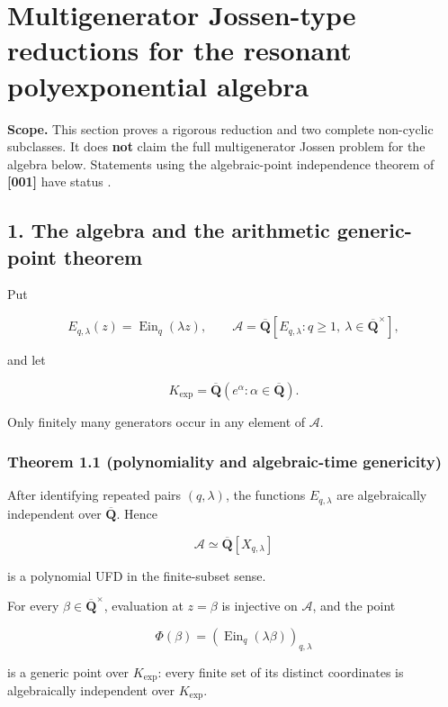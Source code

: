 \section{Multigenerator Jossen-type reductions for the resonant polyexponential algebra}

\begin{notebox}
\textbf{Scope.}  This section proves a rigorous reduction and two complete
non-cyclic subclasses.  It does \textbf{not} claim the full multigenerator
Jossen problem for the algebra below.  Statements using the algebraic-point
independence theorem of \textbf{[001]} have status \RPASS{}.
\end{notebox}

\subsection{1. The algebra and the arithmetic generic-point theorem}

Put

\[
  E_{q,\lambda}(z)=\operatorname{Ein}_q(\lambda z),\qquad
  \mathscr A=\overline{\mathbf Q}
  [E_{q,\lambda}:q\ge 1,\ \lambda\in\overline{\mathbf Q}^{\times}],
\]

and let

\[
  K_{\exp}=\overline{\mathbf Q}
  (e^\alpha:\alpha\in\overline{\mathbf Q}).
\]

Only finitely many generators occur in any element of \(\mathscr A\).

\subsubsection{Theorem 1.1 (polynomiality and algebraic-time genericity)}

After identifying repeated pairs \((q,\lambda)\), the functions
\(E_{q,\lambda}\) are algebraically independent over
\(\overline{\mathbf Q}\). Hence

\[
  \mathscr A\simeq
  \overline{\mathbf Q}[X_{q,\lambda}]
\]

is a polynomial UFD in the finite-subset sense.

For every \(\beta\in\overline{\mathbf Q}^{\times}\), evaluation at \(z=\beta\)
is injective on \(\mathscr A\), and the point

\[
  \Phi(\beta)=
  (\operatorname{Ein}_q(\lambda\beta))_{q,\lambda}
\]

is a generic point over \(K_{\exp}\): every finite set of its distinct
coordinates is algebraically independent over \(K_{\exp}\).

